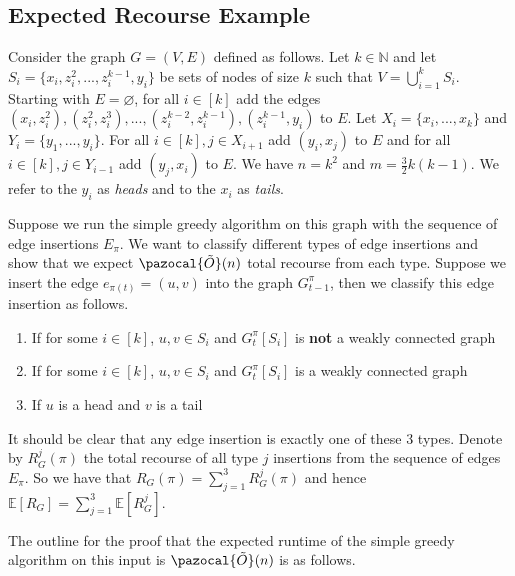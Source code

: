 \documentclass{article}
\begin{document}
\subsection{Expected Recourse Example}

Consider the graph $G=(V,E)$ defined as follows. Let $k \in \mathbb{N}$ and let $S_{i} = \{ x_{i}, z_{i}^{2}, ..., z_{i}^{k-1}, y_{i} \}$ be sets of nodes of size $k$ such that $V = \bigcup_{i=1}^{k}S_{i}$. Starting with $E= \varnothing$, for all $i \in [k]$ add the edges $(x_{i}, z_{i}^{2}), (z_{i}^{2}, z_{i}^{3}), ..., (z_{i}^{k-2}, z_{i}^{k-1}), (z_{i}^{k-1}, y_{i})$ to $E$. Let $X_{i}=\{x_{i},...,x_{k}\}$ and $Y_{i}=\{y_{1},...,y_{i}\}$. For all $i \in [k], j \in X_{i+1}$ add $(y_{i}, x_{j})$ to $E$ and for all $i \in [k], j \in Y_{i-1}$ add $(y_{j}, x_{i})$ to $E$. We have $n=k^2$ and $m=\frac{3}{2}k(k-1)$. We refer to the $y_{i}$ as \textit{heads} and to the $x_{i}$ as \textit{tails}.

Suppose we run the simple greedy algorithm on this graph with the sequence of edge insertions $E_{\pi}$. We want to classify different types of edge insertions and show that we expect $\pazocal{\tilde{O}}(n)$ total recourse from each type. Suppose we insert the edge $e_{\pi(t)}=(u,v)$ into the graph $G_{t-1}^{\pi}$, then we classify this edge insertion as follows.

\begin{enumerate}[Type 1.]
    \item If for some $i \in [k]$, $u,v \in S_{i}$ and $G_{t}^{\pi}[S_{i}]$ is \textbf{not} a weakly connected graph
    \item If for some $i \in [k]$, $u,v \in S_{i}$ and $G_{t}^{\pi}[S_{i}]$ is a weakly connected graph
    \item If $u$ is a head and $v$ is a tail
\end{enumerate}

It should be clear that any edge insertion is exactly one of these 3 types. Denote by $R_{G}^{j}(\pi)$ the total recourse of all type $j$ insertions from the sequence of edges $E_{\pi}$. So we have that $R_{G}(\pi) = \sum_{j=1}^{3}R_{G}^{j}(\pi)$ and hence $\mathbb{E}[R_{G}] = \sum_{j=1}^{3}\mathbb{E}[R_{G}^{j}]$.

The outline for the proof that the expected runtime of the simple greedy algorithm on this input is $\pazocal{\tilde{O}}(n)$ is as follows.
\end{document}
